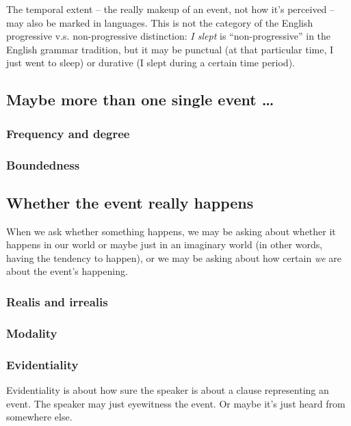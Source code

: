 \documentclass[UTF8, a4paper, oneside, scheme=plain]{ctexart}
\newcommand*{\corpus}[1]{\emph{#1}}
\begin{document}
The temporal extent -- the really makeup of an event, not how it's perceived -- 
may also be marked in languages.
This is not the category of the English progressive v.s. non-progressive distinction:
\corpus{I slept} is ``non-progressive'' in the English grammar tradition,
but it may be punctual (at that particular time, I just went to sleep) 
or durative (I slept during a certain time period).

\subsection{Maybe more than one single event \dots}

\subsubsection{Frequency and degree}

\subsubsection{Boundedness}

\subsection{Whether the event really happens}

When we ask whether something happens,
we may be asking about whether it happens in our world 
or maybe just in an imaginary world (in other words, having the tendency to happen),
or we may be asking about how certain \emph{we} are about the event's happening.

\subsubsection{Realis and irrealis}\label{sec:irrealis}

\subsubsection{Modality}

\subsubsection{Evidentiality}

Evidentiality is about how sure the speaker is about a clause representing an event.
The speaker may just eyewitness the event.
Or maybe it's just heard from somewhere else.
\end{document}
